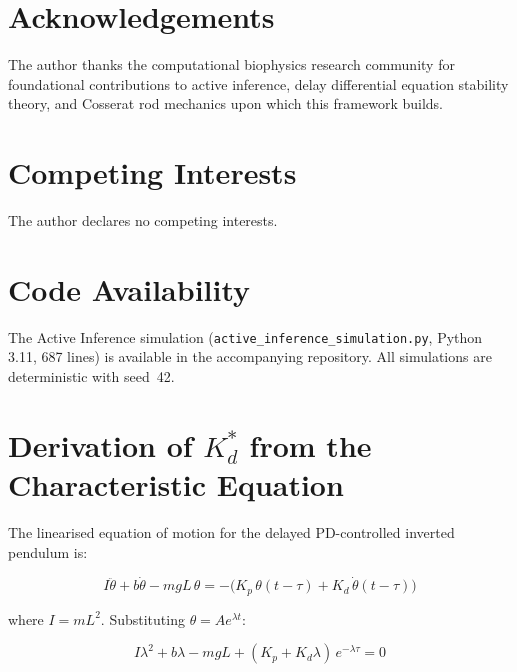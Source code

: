 \documentclass[12pt, letterpaper]{article}
\newcommand{\Kd}{K_d}
\newcommand{\Kdcrit}{K_d^{*}}
\begin{document}
\section*{Acknowledgements}

The author thanks the computational biophysics research community for
foundational contributions to active inference, delay differential equation
stability theory, and Cosserat rod mechanics upon which this framework builds.

\section*{Competing Interests}

The author declares no competing interests.

\section*{Code Availability}

The Active Inference simulation (\texttt{active\_inference\_simulation.py},
Python\,3.11, 687 lines) is available in the accompanying repository. All
simulations are deterministic with seed~42.




\newpage
\appendix

\section{Derivation of $\Kdcrit$ from the Characteristic Equation}
\label{app:derivation}

The linearised equation of motion for the delayed PD-controlled inverted
pendulum is:

\begin{equation}
  I\ddot{\theta} + b\dot{\theta} - mgL\,\theta
    = -\bigl(K_p\,\theta(t-\tau) + \Kd\,\dot{\theta}(t-\tau)\bigr)
\end{equation}

where $I = mL^{2}$. Substituting $\theta = Ae^{\lambda t}$:

\begin{equation*}
  I\lambda^{2} + b\lambda - mgL
    + (K_p + \Kd\lambda)\,e^{-\lambda\tau} = 0
\end{equation*}
\end{document}
